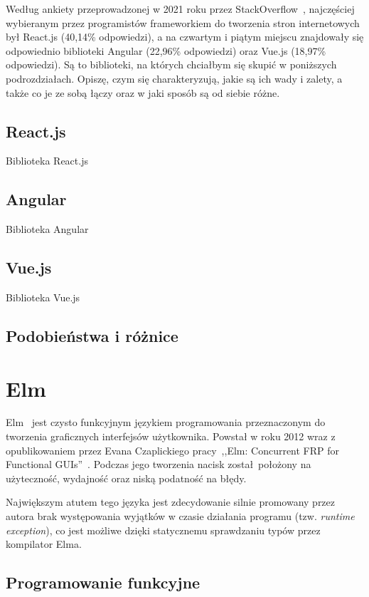 \documentclass[twoside,a4paper]{report}
\begin{document}
Według ankiety przeprowadzonej w 2021 roku przez StackOverflow~\cite{stacksurvey}, najczęściej wybieranym przez programistów frameworkiem do tworzenia stron internetowych był React.js (40,14\% odpowiedzi), a na czwartym i piątym miejscu znajdowały się odpowiednio biblioteki Angular (22,96\% odpowiedzi) oraz Vue.js (18,97\% odpowiedzi).
Są to biblioteki, na których chciałbym się skupić w poniższych podrozdziałach.
Opiszę, czym się charakteryzują, jakie są ich wady i zalety, a także co je ze sobą łączy oraz w jaki sposób są od siebie różne.

\section{React.js}
Biblioteka React.js~\cite{react}
~\cite{reactdocs}
\section{Angular}
Biblioteka Angular~\cite{angulardocs}
~\cite{angulardocs}
\section{Vue.js}
Biblioteka Vue.js~\cite{vuejsdocs}
\section{Podobieństwa i różnice}


\chapter{Elm}
Elm~\cite{elmdocs} jest czysto funkcyjnym językiem programowania przeznaczonym do tworzenia graficznych interfejsów użytkownika.
Powstał w roku 2012 wraz z opublikowaniem przez Evana Czaplickiego pracy~,,Elm: Concurrent FRP for Functional GUIs''~\cite{Czaplicki2012ElmC}.
Podczas jego tworzenia nacisk został położony na użyteczność, wydajność oraz niską podatność na błędy.

Największym atutem tego języka jest zdecydowanie silnie promowany przez autora brak występowania wyjątków w czasie działania programu (tzw. \textit{runtime exception}), co jest możliwe dzięki statycznemu sprawdzaniu typów przez kompilator Elma.

\section{Programowanie funkcyjne}
\end{document}
